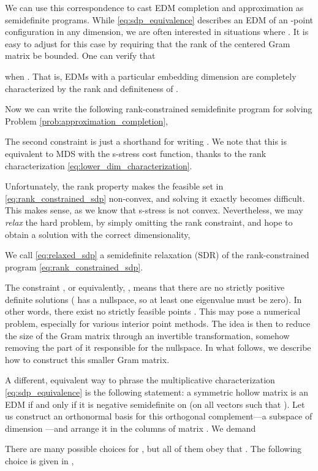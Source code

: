 \documentclass[10pt,double]{IEEEtran}
\newcommand{\rev}[1]{{#1}}
\begin{document}
We can use this correspondence to
cast EDM completion and approximation as semidefinite programs. While
\eqref{eq:sdp_equivalence} describes an EDM of an -point configuration in
any dimension, we are often interested in situations where . It is
easy to adjust for this case by requiring that the rank of the centered Gram
matrix be bounded. One can verify that

when . That is, EDMs with a particular embedding dimension  are
completely characterized by the rank and definiteness of .

Now we can write the following rank-constrained semidefinite program for
solving Problem \ref{prob:approximation_completion},

The second constraint is just a shorthand for writing . We note that this is equivalent to MDS with the s-stress
cost function, thanks to the rank characterization
\eqref{eq:lower_dim_characterization}.

Unfortunately, the rank property makes the feasible set in
\eqref{eq:rank_constrained_sdp} non-convex, and solving it exactly becomes
difficult. This makes sense, as we know that s-stress is not convex.
Nevertheless, we may \emph{relax} the hard problem, by simply omitting the
rank constraint, and hope to obtain a solution with the correct dimensionality,

We call \eqref{eq:relaxed_sdp} a semidefinite relaxation (SDR) of the
rank-constrained program
\eqref{eq:rank_constrained_sdp}. 

The constraint , or equivalently, , means
that there are no strictly positive definite solutions ( has a nullspace,
so at least one eigenvalue must be zero). In other words, there exist no
strictly feasible points
\cite{Krislock:2012xx}. This may pose a numerical problem, especially for
various interior point methods. The idea is then to reduce the size of the
Gram matrix through an invertible transformation, somehow removing the part of
it responsible for the nullspace. \rev{In what follows, we describe how to
construct this smaller Gram matrix.} 

A different, equivalent way to phrase the multiplicative characterization
\eqref{eq:sdp_equivalence} is the following statement: a symmetric hollow
matrix  is an EDM if and only if it is negative semidefinite on
 (on all vectors  such that ). Let
us construct an orthonormal basis for this orthogonal complement---a subspace
of dimension ---and arrange it in the columns of matrix . We demand


There are many possible choices for , but all of them obey that
. The following choice is given in \cite{Alfakih1999},
\end{document}
